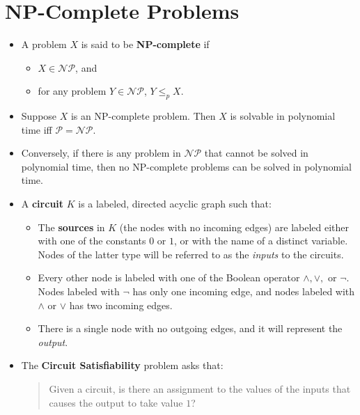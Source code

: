 \documentclass[10pt]{article}
\begin{document}
  \section{NP-Complete Problems} %
  \label{sec:np_complete_problems}
  
  \begin{itemize}
    \item A problem $X$ is said to be \textbf{NP-complete} if
      \begin{itemize}
        \item $X \in \mathcal{NP}$, and
        \item for any problem $Y \in \mathcal{NP}$, $Y \leq_p X$.
      \end{itemize}
      
    \item Suppose $X$ is an NP-complete problem. Then $X$ is solvable in polynomial time iff $\mathcal{P} = \mathcal{NP}$.
    
    \item Conversely, if there is any problem in $\mathcal{NP}$ that cannot be solved in polynomial time, then
      no NP-complete problems can be solved in polynomial time.
      
    \item A \textbf{circuit} $K$ is a labeled, directed acyclic graph such that:
      \begin{itemize}
        \item The \textbf{sources} in $K$ (the nodes with no incoming edges) are labeled either
          with one of the constants $0$ or $1$, or with the name of a distinct variable.
          Nodes of the latter type will be referred to as the \emph{inputs} to the circuits.
          
        \item Every other node is labeled with one of the Boolean operator $\wedge, \vee, $ or $\neg$.
          Nodes labeled with $\neg$ has only one incoming edge, and nodes labeled with $\wedge$ or $\vee$
          has two incoming edges.
          
        \item There is a single node with no outgoing edges, and it will represent the \emph{output}.
      \end{itemize}
      
    \item The \textbf{Circuit Satisfiability} problem asks that:
      \begin{quote}
        Given a circuit, is there an assignment to the values of the inputs that causes
        the output to take value $1$?
      \end{quote}
      

\end{itemize}
\end{document}
